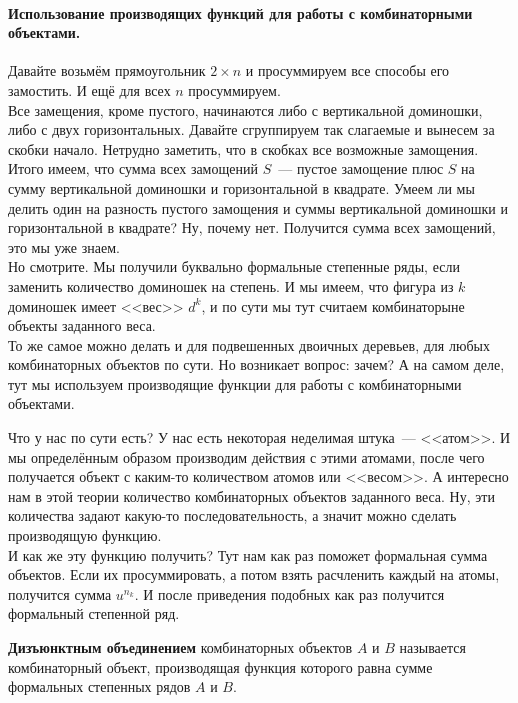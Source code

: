 \documentclass{article}
\begin{document}
    \paragraph{Использование производящих функций для работы с комбинаторными объектами.}
    \begin{remark}
        Давайте возьмём прямоугольник $2\times n$ и просуммируем все способы его замостить. И ещё для всех $n$ просуммируем.\\
        Все замещения, кроме пустого, начинаются либо с вертикальной доминошки, либо с двух горизонтальных. Давайте сгруппируем так слагаемые и вынесем за скобки начало. Нетрудно заметить, что в скобках все возможные замощения. Итого имеем, что сумма всех замощений $S$~--- пустое замощение плюс $S$ на сумму вертикальной доминошки и горизонтальной в квадрате. Умеем ли мы делить один на разность пустого замощения и суммы вертикальной доминошки и горизонтальной в квадрате? Ну, почему нет. Получится сумма всех замощений, это мы уже знаем.\\
        Но смотрите. Мы получили буквально формальные степенные ряды, если заменить количество доминошек на степень. И мы имеем, что фигура из $k$ доминошек имеет <<вес>> $d^k$, и по сути мы тут считаем комбинаторыне объекты заданного веса.\\
        То же самое можно делать и для подвешенных двоичных деревьев, для любых комбинаторных объектов по сути. Но возникает вопрос: зачем? А на самом деле, тут мы используем производящие функции для работы с комбинаторными объектами.
    \end{remark}
    \begin{remark}
        Что у нас по сути есть? У нас есть некоторая неделимая штука~--- <<атом>>. И мы определённым образом производим действия с этими атомами, после чего получается объект с каким-то количеством атомов или <<весом>>. А интересно нам в этой теории количество комбинаторных объектов заданного веса. Ну, эти количества задают какую-то последовательность, а значит можно сделать производящую функцию.\\
        И как же эту функцию получить? Тут нам как раз поможет формальная сумма объектов. Если их просуммировать, а потом взять расчленить каждый на атомы, получится сумма $u^{n_k}$. И после приведения подобных как раз получится формальный степенной ряд.
    \end{remark}
    \begin{definition}
        \textbf{Дизъюнктным объединением} комбинаторных объектов $A$ и $B$ называется комбинаторный объект, производящая функция которого равна сумме формальных степенных рядов $A$ и $B$.
    \end{definition}
\end{document}
